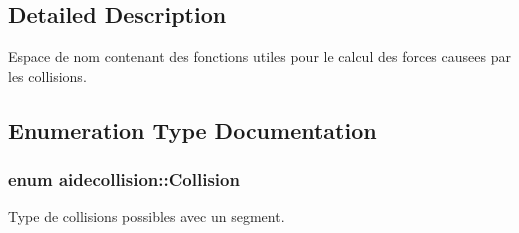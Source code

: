 \subsection{Detailed Description}
Espace de nom contenant des fonctions utiles pour le calcul des forces causees par les collisions. 

\subsection{Enumeration Type Documentation}
\hypertarget{namespaceaidecollision_a1c8613e2393aa3268262f9d23d60c0c9}{
\subsubsection[{Collision}]{\setlength{\rightskip}{0pt plus 5cm}enum {\bf aidecollision\-::\-Collision}}}\label{namespaceaidecollision_a1c8613e2393aa3268262f9d23d60c0c9}


Type de collisions possibles avec un segment. 

